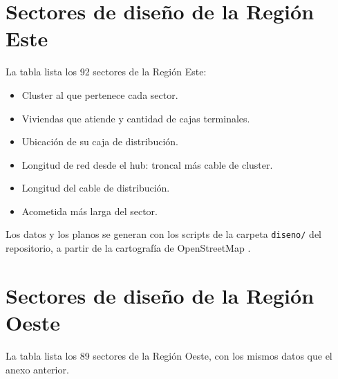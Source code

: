 \appendix
\section{Sectores de diseño de la Región Este}
\label{anexo:sectores}
La tabla lista los 92 sectores de la Región Este:
\begin{itemize}
    \item Cluster al que pertenece cada sector.
    \item Viviendas que atiende y cantidad de cajas terminales.
    \item Ubicación de su caja de distribución.
    \item Longitud de red desde el hub: troncal más cable de cluster.
    \item Longitud del cable de distribución.
    \item Acometida más larga del sector.
\end{itemize}
Los datos y los planos se generan con los scripts de la carpeta \texttt{diseno/} del repositorio, a partir de la cartografía de OpenStreetMap \cite{osm}.



\section{Sectores de diseño de la Región Oeste}
\label{anexo:sectores_O}
La tabla lista los 89 sectores de la Región Oeste, con los mismos datos que el anexo anterior.



